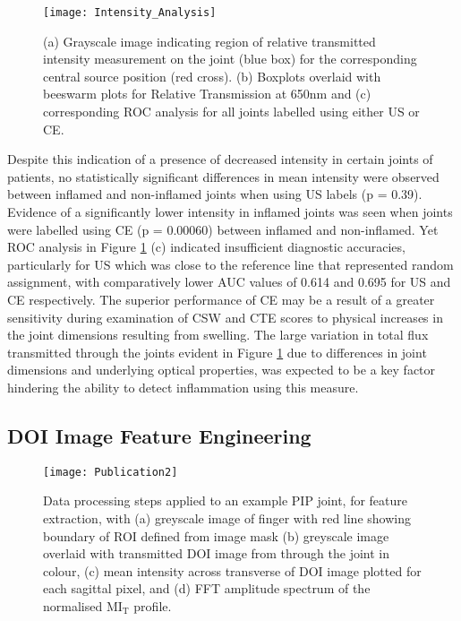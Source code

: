 \documentclass[twoside]{bhamthesis}
\theoremstyle{definition}
\begin{document}
\begin{figure}[!ht]
\centering\texttt{[image: Intensity\_Analysis]}\caption{ (a) Grayscale image indicating region of relative transmitted intensity measurement on the joint (blue box) for the corresponding central source position (red cross). (b) Boxplots overlaid with beeswarm plots for Relative Transmission at 650nm and (c) corresponding ROC analysis for all joints labelled using either US or CE.}
\label{fig:Intensity_Analysis}
\end{figure}

Despite this indication of a presence of decreased intensity in certain joints of patients, no statistically significant differences in mean intensity were observed between inflamed and non-inflamed joints when using US labels (p = 0.39). Evidence of a significantly lower intensity in inflamed joints was seen when joints were labelled using CE (p = 0.00060) between inflamed and non-inflamed. Yet ROC analysis in Figure \ref{fig:Intensity_Analysis} (c) indicated insufficient diagnostic accuracies, particularly for US which was close to the reference line that represented random assignment, with comparatively lower AUC values of 0.614 and 0.695 for US and CE respectively. The superior performance of CE may be a result of a greater sensitivity during examination of CSW and CTE scores to physical increases in the joint dimensions resulting from swelling. The large variation in total flux transmitted through the joints evident in Figure \ref{fig:Intensity_Analysis} due to differences in joint dimensions and underlying optical properties, was expected to be a key factor hindering the ability to detect inflammation using this measure.


\subsection{DOI Image Feature Engineering}
\label{DOI Image Feature Engineering}

\begin{figure}[!ht]
\centering
  \texttt{[image: Publication2]}
\caption{Data processing steps applied to an example PIP joint, for feature extraction, with (a) greyscale image of finger with red line showing boundary of ROI defined from image mask (b) greyscale image overlaid with transmitted DOI image from through the joint in colour, (c) mean intensity across transverse of DOI image plotted for each sagittal pixel, and (d) FFT amplitude spectrum of the normalised $\mathrm{MI_T}$ profile.}
\label{fig:Feature_extraction}
\end{figure}
\end{document}
